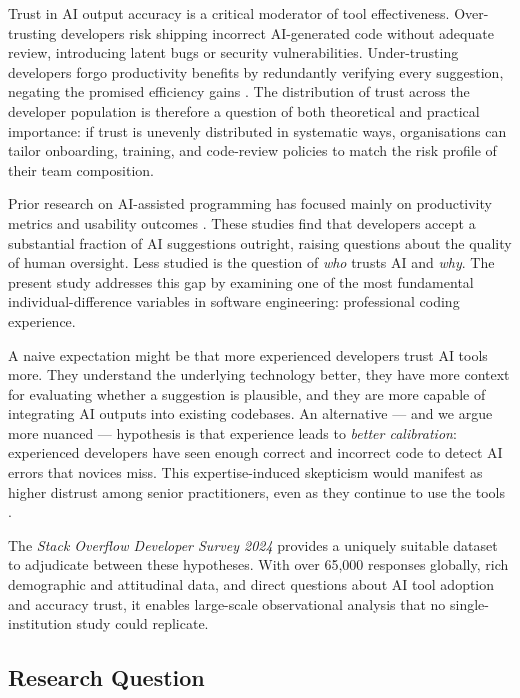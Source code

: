 \documentclass[11pt,a4paper]{article}
\begin{document}
Trust in AI output accuracy is a critical moderator of tool effectiveness. Over-trusting
developers risk shipping incorrect AI-generated code without adequate review, introducing
latent bugs or security vulnerabilities. Under-trusting developers forgo productivity
benefits by redundantly verifying every suggestion, negating the promised efficiency gains
\cite{cai2019hello}. The distribution of trust across the developer population is therefore
a question of both theoretical and practical importance: if trust is unevenly distributed
in systematic ways, organisations can tailor onboarding, training, and code-review policies
to match the risk profile of their team composition.

Prior research on AI-assisted programming has focused mainly on productivity metrics and
usability outcomes \cite{vaithilingam2022expectation, ziegler2022productivity, bird2022copilot}.
These studies find that developers accept a substantial fraction of AI suggestions outright,
raising questions about the quality of human oversight. Less studied is the question of
\emph{who} trusts AI and \emph{why}. The present study addresses this gap by examining
one of the most fundamental individual-difference variables in software engineering:
professional coding experience.

A naive expectation might be that more experienced developers trust AI tools more. They
understand the underlying technology better, they have more context for evaluating whether
a suggestion is plausible, and they are more capable of integrating AI outputs into
existing codebases. An alternative --- and we argue more nuanced --- hypothesis is that
experience leads to \emph{better calibration}: experienced developers have seen enough
correct and incorrect code to detect AI errors that novices miss. This expertise-induced
skepticism would manifest as higher distrust among senior practitioners, even as they
continue to use the tools \cite{liao2023transparency}.

The \emph{Stack Overflow Developer Survey 2024} provides a uniquely suitable dataset to
adjudicate between these hypotheses. With over 65,000 responses globally, rich demographic
and attitudinal data, and direct questions about AI tool adoption and accuracy trust, it
enables large-scale observational analysis that no single-institution study could replicate.

\subsection{Research Question}
\end{document}
